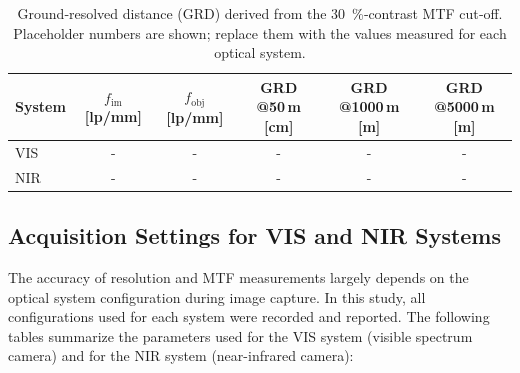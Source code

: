 \begin{table}[h]
    \centering
    \caption{Ground‑resolved distance (GRD) derived from the 30 \%‑contrast MTF cut‑off. 
             Placeholder numbers are shown; replace them with the values measured for
             each optical system.}
    \label{tab:grd_results}
    \begin{tabularx}{\linewidth}{|l|C|C|C|C|C|}
        \hline
        \textbf{System} & 
        $f_{\text{im}}$ [lp/mm] & 
        $f_{\text{obj}}$ [lp/mm] & 
        GRD @50\,m [cm] & 
        GRD @1000\,m [m] &
        GRD @5000\,m [m] \\
        \hline
        VIS & - & - & - & - & - \\
        NIR & - & - & - & - & - \\
        \hline
    \end{tabularx}
\end{table}



\subsection{Acquisition Settings for VIS and NIR Systems}

The accuracy of resolution and MTF measurements largely depends on the optical system configuration during image capture. In this study, all configurations used for each system were recorded and reported. The following tables summarize the parameters used for the VIS system (visible spectrum camera) and for the NIR system (near-infrared camera):


